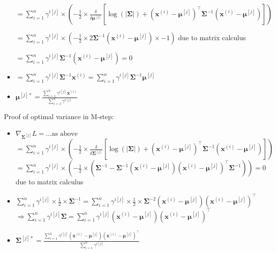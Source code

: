 \begin{itemize}
    $
    = \sum_{i=1}^n \gamma^{i[j]} \times \left( -\frac{1}{2} \times \frac{\delta}{\delta \boldsymbol{\mu}^{[j]}} \left[ \log(|\boldsymbol{\Sigma}|)+ (\boldsymbol{x}^{(i)} - \boldsymbol{\mu}^{[j]})^\intercal \boldsymbol{\Sigma}^{-1} (\boldsymbol{x}^{(i)} - \boldsymbol{\mu}^{[j]}) \right] \right)
    $

    $
    = \sum_{i=1}^n \gamma^{i[j]} \times \left( -\frac{1}{2} \times 2\boldsymbol{\Sigma}^{-1} (\boldsymbol{x}^{(i)} - \boldsymbol{\mu}^{[j]}) \times -1 \right)
    $ due to matrix calculus

    $
    = \sum_{i=1}^n \gamma^{i[j]} \boldsymbol{\Sigma}^{-1} (\boldsymbol{x}^{(i)} - \boldsymbol{\mu}^{[j]}) = 0
    $
        
    \item $
    = \sum_{i=1}^n \gamma^{i[j]} \boldsymbol{\Sigma}^{-1} \boldsymbol{x}^{(i)} = \sum_{i=1}^n \gamma^{i[j]} \boldsymbol{\Sigma}^{-1}\boldsymbol{\mu}^{[j]}
    $

    \item $
    \boldsymbol{\mu}^{[j]*} = \frac{\sum_{i=1}^n \gamma^{i[j]} \boldsymbol{x}^{(i)}}{\sum_{i=1}^n \gamma^{i[j]}}
    $
\end{itemize}
Proof of optimal variance in M-step:
\begin{itemize}
    \item $ \nabla_{\boldsymbol{\Sigma}^{[j]}} L = ... \text{as above}
    $
    $
    = \sum_{i=1}^n \gamma^{i[j]} \times \left( -\frac{1}{2} \times \frac{\delta}{\delta \boldsymbol{\Sigma}^{[j]}} \left[ \log(|\boldsymbol{\Sigma}|)+ (\boldsymbol{x}^{(i)} - \boldsymbol{\mu}^{[j]})^\intercal \boldsymbol{\Sigma}^{-1} (\boldsymbol{x}^{(i)} - \boldsymbol{\mu}^{[j]}) \right] \right)
    $
    $
    = \sum_{i=1}^n \gamma^{i[j]} \times \left( -\frac{1}{2} \times (\boldsymbol{\Sigma}^{-1} - \boldsymbol{\Sigma}^{-1} (\boldsymbol{x}^{(i)} - \boldsymbol{\mu}^{[j]})(\boldsymbol{x}^{(i)} - \boldsymbol{\mu}^{[j]})^\intercal \boldsymbol{\Sigma}^{-1}) \right) = 0
    $ due to matrix calculus
    \item $
    \sum_{i=1}^n \gamma^{i[j]} \times \frac{1}{2} \times \boldsymbol{\Sigma}^{-1} =  \sum_{i=1}^n \gamma^{i[j]} \times \frac{1}{2} \times \boldsymbol{\Sigma}^{-2} (\boldsymbol{x}^{(i)} - \boldsymbol{\mu}^{[j]})(\boldsymbol{x}^{(i)} - \boldsymbol{\mu}^{[j]})^\intercal
    $
    $
    \Rightarrow \sum_{i=1}^n \gamma^{i[j]} \boldsymbol{\Sigma} =  \sum_{i=1}^n \gamma^{i[j]} (\boldsymbol{x}^{(i)} - \boldsymbol{\mu}^{[j]})(\boldsymbol{x}^{(i)} - \boldsymbol{\mu}^{[j]})^\intercal
    $
    \item $
    \boldsymbol{\Sigma}^{[j]*} = \frac{\sum_{i=1}^n \gamma^{i[j]} (\boldsymbol{x}^{(i)} - \boldsymbol{\mu}^{[j]})(\boldsymbol{x}^{(i)} - \boldsymbol{\mu}^{[j]})^\intercal}{\sum_{i=1}^n \gamma^{i[j]}}
    $
\end{itemize}

